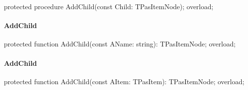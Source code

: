 \documentclass{report}
\newif\ifpdf
\begin{document}
\label{PasDoc_HierarchyTree.TPasItemNode-AddChild}
\begin{list}{}{
\setlength{\itemindent}{0cm}
\setlength{\listparindent}{0cm}
\setlength{\leftmargin}{\evensidemargin}
\addtolength{\leftmargin}{\tmplength}
\settowidth{\labelsep}{X}
\addtolength{\leftmargin}{\labelsep}
\setlength{\labelwidth}{\tmplength}
}
\item[\textbf{Declaration}\hfill]
\ifpdf
\begin{flushleft}
\fi
\begin{ttfamily}
protected procedure AddChild(const Child: TPasItemNode); overload;\end{ttfamily}

\ifpdf
\end{flushleft}
\fi

\end{list}
\paragraph*{AddChild}\hspace*{\fill}

\label{PasDoc_HierarchyTree.TPasItemNode-AddChild}
\begin{list}{}{
\setlength{\itemindent}{0cm}
\setlength{\listparindent}{0cm}
\setlength{\leftmargin}{\evensidemargin}
\addtolength{\leftmargin}{\tmplength}
\settowidth{\labelsep}{X}
\addtolength{\leftmargin}{\labelsep}
\setlength{\labelwidth}{\tmplength}
}
\item[\textbf{Declaration}\hfill]
\ifpdf
\begin{flushleft}
\fi
\begin{ttfamily}
protected function AddChild(const AName: string): TPasItemNode; overload;\end{ttfamily}

\ifpdf
\end{flushleft}
\fi

\end{list}
\paragraph*{AddChild}\hspace*{\fill}

\label{PasDoc_HierarchyTree.TPasItemNode-AddChild}
\begin{list}{}{
\setlength{\itemindent}{0cm}
\setlength{\listparindent}{0cm}
\setlength{\leftmargin}{\evensidemargin}
\addtolength{\leftmargin}{\tmplength}
\settowidth{\labelsep}{X}
\addtolength{\leftmargin}{\labelsep}
\setlength{\labelwidth}{\tmplength}
}
\item[\textbf{Declaration}\hfill]
\ifpdf
\begin{flushleft}
\fi
\begin{ttfamily}
protected function AddChild(const AItem: TPasItem): TPasItemNode; overload;\end{ttfamily}

\ifpdf
\end{flushleft}
\fi

\end{list}
\end{document}
